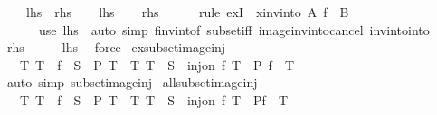 \begin{isabellebody}
\ \ \ {\isacharparenleft}\ {\isachardoublequoteopen}{\isacharquery}lhs\ {\isacharequal}\ {\isacharquery}rhs{\isachardoublequoteclose}{\isacharparenright}\isanewline
%
\isadelimproof
%
\endisadelimproof
%
\isatagproof
{}\isamarkupfalse%
\isanewline
\ \ \isamarkupfalse%
\ {\isacharquery}lhs\isanewline
\ \ \isamarkupfalse%
\ {\isacharquery}rhs\isanewline
\ \ \ \ \isamarkupfalse%
\ {\isacharparenleft}rule\ exI\ {\isacharbrackleft}\ x{\isacharequal}{\isachardoublequoteopen}inv{\isacharunderscore}into\ A\ f\ {\isacharbackquote}\ B{\isachardoublequoteclose}{\isacharbrackright}{\isacharparenright}\isanewline
\ \ \ \ \ \ {\isacharparenleft}use\ {\isacartoucheopen}{\isacharquery}lhs{\isacartoucheclose}\ \ {\isacartoucheopen}auto\ simp{\isacharcolon}\ f{\isacharunderscore}inv{\isacharunderscore}into{\isacharunderscore}f\ subset{\isacharunderscore}iff\ image{\isacharunderscore}inv{\isacharunderscore}into{\isacharunderscore}cancel\ inv{\isacharunderscore}into{\isacharunderscore}into{\isacartoucheclose}{\isacharparenright}\isanewline
{}\isamarkupfalse%
\isanewline
\ \ \isamarkupfalse%
\ {\isacharquery}rhs\isanewline
\ \ \isamarkupfalse%
\ \isamarkupfalse%
\ {\isacharquery}lhs\ \isamarkupfalse%
\ force\isanewline
{}\isamarkupfalse%
%
\endisatagproof
{\isafoldproof}%
%
\isadelimproof
\isanewline
%
\endisadelimproof
\isanewline
{}\isamarkupfalse%
\ ex{\isacharunderscore}subset{\isacharunderscore}image{\isacharunderscore}inj{\isacharcolon}\isanewline
\ \ \ {\isachardoublequoteopen}{\isacharparenleft}{\isasymexists}T{\isachardot}\ T\ {\isasymsubseteq}\ f\ {\isacharbackquote}\ S\ {\isasymand}\ P\ T{\isacharparenright}\ {\isasymlongleftrightarrow}\ {\isacharparenleft}{\isasymexists}T{\isachardot}\ T\ {\isasymsubseteq}\ S\ {\isasymand}\ inj{\isacharunderscore}on\ f\ T\ {\isasymand}\ P\ {\isacharparenleft}f\ {\isacharbackquote}\ T{\isacharparenright}{\isacharparenright}{\isachardoublequoteclose}\isanewline
%
\isadelimproof
\ \ %
\endisadelimproof
%
\isatagproof
{}\isamarkupfalse%
\ {\isacharparenleft}auto\ simp{\isacharcolon}\ subset{\isacharunderscore}image{\isacharunderscore}inj{\isacharparenright}%
\endisatagproof
{\isafoldproof}%
%
\isadelimproof
\isanewline
%
\endisadelimproof
\isanewline
{}\isamarkupfalse%
\ all{\isacharunderscore}subset{\isacharunderscore}image{\isacharunderscore}inj{\isacharcolon}\isanewline
\ \ \ {\isachardoublequoteopen}{\isacharparenleft}{\isasymforall}T{\isachardot}\ T\ {\isasymsubseteq}\ f\ {\isacharbackquote}\ S\ {\isasymlongrightarrow}\ P\ T{\isacharparenright}\ {\isasymlongleftrightarrow}\ {\isacharparenleft}{\isasymforall}T{\isachardot}\ T\ {\isasymsubseteq}\ S\ {\isasymand}\ inj{\isacharunderscore}on\ f\ T\ {\isasymlongrightarrow}\ P{\isacharparenleft}f\ {\isacharbackquote}\ T{\isacharparenright}{\isacharparenright}{\isachardoublequoteclose}\isanewline

\end{isabellebody}
